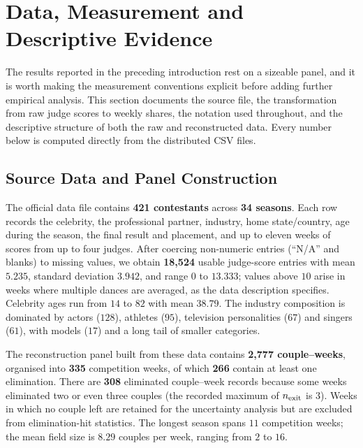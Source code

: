 \section{Data, Measurement and Descriptive Evidence}\label{sec:eda}

The results reported in the preceding introduction rest on a sizeable panel, and it is worth
making the measurement conventions explicit before adding further empirical analysis. This
section documents the source file, the transformation from raw judge scores to weekly shares,
the notation used throughout, and the descriptive structure of both the raw and reconstructed
data. Every number below is computed directly from the distributed CSV files.

\subsection{Source Data and Panel Construction}\label{sec:eda_source}

The official data file contains \textbf{421 contestants} across \textbf{34 seasons}. Each row
records the celebrity, the professional partner, industry, home state/country, age during the
season, the final result and placement, and up to eleven weeks of scores from up to four judges.
After coercing non-numeric entries (``N/A'' and blanks) to missing values, we obtain
\textbf{18{,}524} usable judge-score entries with mean $5.235$, standard deviation $3.942$,
and range $0$ to $13.333$; values above $10$ arise in weeks where multiple dances are averaged,
as the data description specifies. Celebrity ages run from $14$ to $82$ with mean $38.79$.
The industry composition is dominated by actors ($128$), athletes ($95$), television
personalities ($67$) and singers ($61$), with models ($17$) and a long tail of smaller categories.

The reconstruction panel built from these data contains \textbf{2{,}777 couple--weeks},
organised into \textbf{335} competition weeks, of which \textbf{266} contain at least one
elimination. There are \textbf{308} eliminated couple--week records because some weeks eliminated
two or even three couples (the recorded maximum of $n_{\rm exit}$ is $3$). Weeks in which no
couple left are retained for the uncertainty analysis but are excluded from elimination-hit
statistics. The longest season spans $11$ competition weeks; the mean field size is $8.29$
couples per week, ranging from $2$ to $16$.


